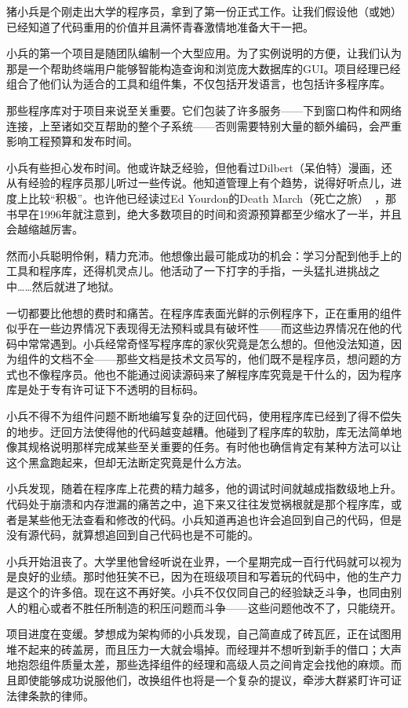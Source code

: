 \documentclass[12pt,oneside]{ctexbook}
\begin{document}
\begin{common-format}
猪小兵是个刚走出大学的程序员，拿到了第一份正式工作。让我们假设他（或她）已经知道了代码重用的价值并且满怀青春激情地准备大干一把。

小兵的第一个项目是随团队编制一个大型应用。为了实例说明的方便，让我们认为那是一个帮助终端用户能够智能构造查询和浏览庞大数据库的GUI。项目经理已经组合了他们认为适合的工具和组件集，不仅包括开发语言，也包括许多程序库。

那些程序库对于项目来说至关重要。它们包装了许多服务——下到窗口构件和网络连接，上至诸如交互帮助的整个子系统——否则需要特别大量的额外编码，会严重影响工程预算和发布时间。

小兵有些担心发布时间。他或许缺乏经验，但他看过Dilbert（呆伯特）漫画，还从有经验的程序员那儿听过一些传说。他知道管理上有个趋势，说得好听点儿，进度上比较“积极”。也许他已经读过Ed Yourdon的Death March（死亡之旅）~\cite{Yourdon}，那书早在1996年就注意到，绝大多数项目的时间和资源预算都至少缩水了一半，并且会越缩越厉害。

然而小兵聪明伶俐，精力充沛。他想像出最可能成功的机会：学习分配到他手上的工具和程序库，还得机灵点儿。他活动了一下打字的手指，一头猛扎进挑战之中……然后就进了地狱。

一切都要比他想的费时和痛苦。在程序库表面光鲜的示例程序下，正在重用的组件似乎在一些边界情况下表现得无法预料或具有破坏性——而这些边界情况在他的代码中常常遇到。小兵经常奇怪写程序库的家伙究竟是怎么想的。但他没法知道，因为组件的文档不全——那些文档是技术文员写的，他们既不是程序员，想问题的方式也不像程序员。他也不能通过阅读源码来了解程序库究竟是干什么的，因为程序库是处于专有许可证下不透明的目标码。

小兵不得不为组件问题不断地编写复杂的迂回代码，使用程序库已经到了得不偿失的地步。迂回方法使得他的代码越变越糟。他碰到了程序库的软肋，库无法简单地像其规格说明那样完成某些至关重要的任务。有时他也确信肯定有某种方法可以让这个黑盒跑起来，但却无法断定究竟是什么方法。

小兵发现，随着在程序库上花费的精力越多，他的调试时间就越成指数级地上升。代码处于崩溃和内存泄漏的痛苦之中，追下来又往往发觉祸根就是那个程序库，或者是某些他无法查看和修改的代码。小兵知道再追也许会追回到自己的代码，但是没有源代码，就算想追回到自己代码也是不可能的。

小兵开始沮丧了。大学里他曾经听说在业界，一个星期完成一百行代码就可以视为是良好的业绩。那时他狂笑不已，因为在班级项目和写着玩的代码中，他的生产力是这个的许多倍。现在这不再好笑。小兵不仅仅同自己的经验缺乏斗争，也同由别人的粗心或者不胜任所制造的积压问题而斗争——这些问题他改不了，只能绕开。

项目进度在变缓。梦想成为架构师的小兵发现，自己简直成了砖瓦匠，正在试图用堆不起来的砖盖房，而且压力一大就会塌掉。而经理并不想听到新手的借口；大声地抱怨组件质量太差，那些选择组件的经理和高级人员之间肯定会找他的麻烦。而且即使能够成功说服他们，改换组件也将是一个复杂的提议，牵涉大群紧盯许可证法律条款的律师。


\end{common-format}
\end{document}
